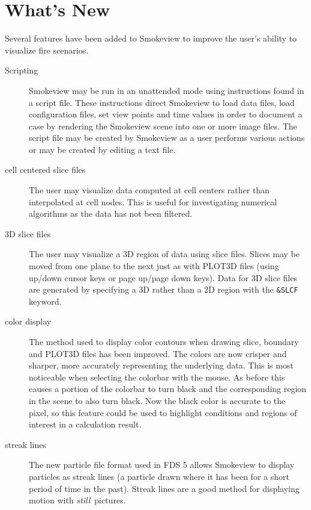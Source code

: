 \documentclass[11pt,twoside]{book}
\begin{document}
\section{What's New}
Several features have been added to Smokeview to improve the
user's ability to visualize fire scenarios.

\begin{description}

\item[Scripting] Smokeview may be run in an unattended mode using
instructions found in a script file.
These instructions direct Smokeview to load data files, load configuration files,
set view points and time values in order to document a case by rendering
the Smokeview scene into one or more image files.
The script file may be created by Smokeview as a user performs various actions
or may be created by editing a text file.

\item[cell centered slice files] The user may visualize data computed
at cell centers rather than interpolated at cell nodes.  This is useful for
investigating numerical algorithms as the data has not been filtered.

\item[3D slice files] The user may visualize a 3D region of
data using slice files.  Slices may be moved from one plane to
the next just as with PLOT3D files (using up/down cursor keys or
page up/page down keys).
Data for 3D slice files are generated by specifying a 3D rather than a 2D region with the {\tt \&SLCF} keyword.

\item[color display] The method used to display color contours when drawing
slice, boundary and PLOT3D files has been improved. The colors are
now crisper and sharper, more accurately representing the
underlying data. This is most noticeable when selecting the
colorbar with the mouse. As before this causes a portion of the
colorbar to turn black and the corresponding region in the scene
to also turn black.  Now the black color is accurate to the pixel,
so this feature could be used to highlight conditions and regions of interest in a calculation result.

\item[streak lines]The new particle file format used in FDS 5
allows Smokeview to display particles as streak lines (a particle
drawn where it has been for a short period of time in the past).
Streak lines are a good method for displaying motion with
{\em still}\ pictures.


\end{description}
\end{document}
